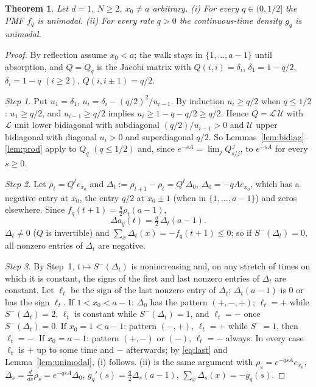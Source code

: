 \documentclass[11pt,a4paper]{article}
\newtheorem{theorem}{Theorem}[section]
\theoremstyle{definition}
\newcommand{\Sm}{S^{-}}
\begin{document}
\begin{theorem}\label{thm:1d}
Let $d=1$, $N\ge2$, $x_0\ne a$ arbitrary. (i) For every $q\in(0,1/2]$ the PMF $f_q$ is unimodal. (ii) For every rate $q>0$ the continuous-time density $g_q$ is unimodal.
\end{theorem}
\begin{proof}
By reflection assume $x_0<a$; the walk stays in $\{1,\dots,a-1\}$ until absorption, and $Q=Q_q$ is the Jacobi matrix with $Q(i,i)=\delta_i$, $\delta_1=1-q/2$, $\delta_i=1-q$ $(i\ge2)$, $Q(i,i\pm1)=q/2$.

\emph{Step 1.} Put $u_1=\delta_1$, $u_i=\delta_i-(q/2)^2/u_{i-1}$. By induction $u_i\ge q/2$ when $q\le1/2$: $u_1\ge q/2$, and $u_{i-1}\ge q/2$ implies $u_i\ge1-q-q/2\ge q/2$. Hence $Q=\mathcal L\,\mathcal U$ with $\mathcal L$ unit lower bidiagonal with subdiagonal $(q/2)/u_{i-1}>0$ and $\mathcal U$ upper bidiagonal with diagonal $u_i>0$ and superdiagonal $q/2$. So Lemmas~\ref{lem:bidiag}--\ref{lem:prod} apply to $Q_q$ $(q\le1/2)$ and, since $e^{-sA}=\lim_jQ_{s/j}^{\,j}$, to $e^{-sA}$ for every $s\ge0$.

\emph{Step 2.} Let $\rho_t=Q^te_{x_0}$ and $\Delta_t:=\rho_{t+1}-\rho_t=Q^t\Delta_0$, $\Delta_0=-qAe_{x_0}$, which has a negative entry at $x_0$, the entry $q/2$ at $x_0\pm1$ (when in $\{1,\dots,a-1\}$) and zeros elsewhere. Since $f_q(t+1)=\frac q2\rho_t(a-1)$,
\begin{equation}\label{eq:last}
\Delta a_q(t)=\tfrac q2\,\Delta_t(a-1).
\end{equation}
$\Delta_t\ne0$ ($Q$ is invertible) and $\sum_x\Delta_t(x)=-f_q(t+1)\le0$; so if $\Sm(\Delta_t)=0$, all nonzero entries of $\Delta_t$ are negative.

\emph{Step 3.} By Step~1, $t\mapsto\Sm(\Delta_t)$ is nonincreasing and, on any stretch of times on which it is constant, the signs of the first and last nonzero entries of $\Delta_t$ are constant. Let $\ell_t$ be the sign of the last nonzero entry of $\Delta_t$; $\Delta_t(a-1)$ is $0$ or has the sign $\ell_t$. If $1<x_0<a-1$: $\Delta_0$ has the pattern $(+,-,+)$; $\ell_t=+$ while $\Sm(\Delta_t)=2$, $\ell_t$ is constant while $\Sm(\Delta_t)=1$, and $\ell_t=-$ once $\Sm(\Delta_t)=0$. If $x_0=1<a-1$: pattern $(-,+)$, $\ell_t=+$ while $\Sm=1$, then $\ell_t=-$. If $x_0=a-1$: pattern $(+,-)$ or $(-)$, $\ell_t=-$ always. In every case $\ell_t$ is $+$ up to some time and $-$ afterwards; by \eqref{eq:last} and Lemma~\ref{lem:unimodal}, (i) follows. (ii) is the same argument with $\rho_s=e^{-qsA}e_{x_0}$, $\Delta_s=\frac{d}{ds}\rho_s=e^{-qsA}\Delta_0$, $g_q'(s)=\frac q2\Delta_s(a-1)$, $\sum_x\Delta_s(x)=-g_q(s)$.
\end{proof}
\end{document}
